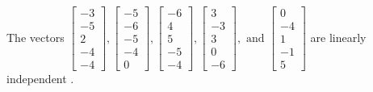 \begin{exercise}
\begin{exerciseStatement}
  \end{exerciseStatement}
  \begin{exerciseAnswer}
   The vectors \(\left[\begin{array}{r}
-3 \\
-5 \\
2 \\
-4 \\
-4
\end{array}\right] , \left[\begin{array}{r}
-5 \\
-6 \\
-5 \\
-4 \\
0
\end{array}\right] , \left[\begin{array}{r}
-6 \\
4 \\
5 \\
-5 \\
-4
\end{array}\right] , \left[\begin{array}{r}
3 \\
-3 \\
3 \\
0 \\
-6
\end{array}\right] , \text{ and } \left[\begin{array}{r}
0 \\
-4 \\
1 \\
-1 \\
5
\end{array}\right]\) are 
  	 linearly independent  .
  


  \end{exerciseAnswer}
\end{exercise}